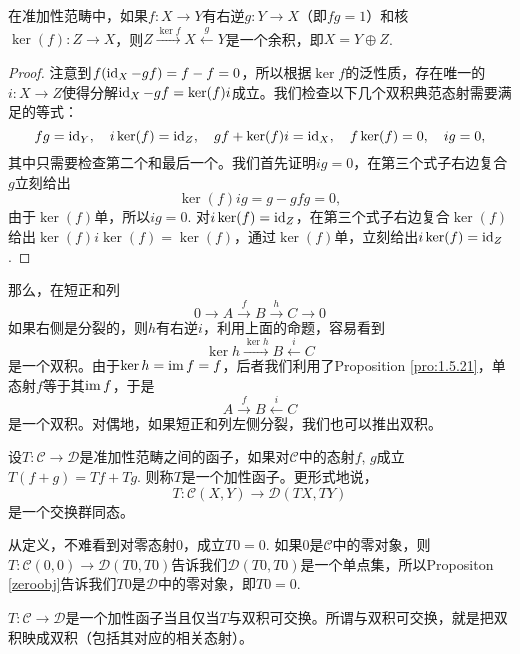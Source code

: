 \begin{pro}
在准加性范畴中，如果$f:X\to Y$有右逆$g:Y\to X$（即$fg=1$）和核$\ker(f):Z\to X$，则$Z\xrightarrow{\ker f}X\xleftarrow{g}Y$是一个余积，即$X=Y\oplus Z$.
\end{pro}

\begin{proof}
注意到$f(\operatorname{id}_X-gf)=f-f=0$，所以根据$\ker f$的泛性质，存在唯一的$i:X\to Z$使得分解$\operatorname{id}_X-gf=\ker (f)i$成立。我们检查以下几个双积典范态射需要满足的等式：
\[
	fg=\operatorname{id}_Y,\quad i\ker(f)=\operatorname{id}_{Z},\quad gf+\ker (f)i=\operatorname{id}_X,\quad f\ker(f)=0,\quad 
	ig=0,
\]
其中只需要检查第二个和最后一个。我们首先证明$ig=0$，在第三个式子右边复合$g$立刻给出
\[
	\ker(f)ig=g-gfg=0,
\]
由于$\ker(f)$单，所以$ig=0$. 对$i\ker(f)=\operatorname{id}_{Z}$，在第三个式子右边复合$\ker(f)$给出$\ker(f)i\ker(f)=\ker(f)$，通过$\ker(f)$单，立刻给出$i\ker(f)=\operatorname{id}_{Z}$.
\end{proof}

那么，在短正和列
\[
	0\to A\xrightarrow{f}B\xrightarrow{h}C\to 0
\]
如果右侧是分裂的，则$h$有右逆$i$，利用上面的命题，容易看到
\[
	\ker h\xrightarrow{\ker h}B\xleftarrow{i}C
\]
是一个双积。由于$\ker h = \operatorname{im} f=f$，后者我们利用了Proposition \ref{pro:1.5.21}，单态射$f$等于其$\operatorname{im} f$，于是
\[
	A\xrightarrow{f}B\xleftarrow{i}C
\]
是一个双积。对偶地，如果短正和列左侧分裂，我们也可以推出双积。


\begin{para}
设$T:\mathcal{C}\to \mathcal{D}$是准加性范畴之间的函子，如果对$\mathcal{C}$中的态射$f$, $g$成立$T(f+g)=Tf+Tg$. 则称$T$是一个加性函子。更形式地说，
\[
	T:\mathcal{C}(X,Y)\to \mathcal{D}(TX,TY)
\]
是一个交换群同态。
\end{para}

从定义，不难看到对零态射$0$，成立$T0=0$. 如果$0$是$\mathcal{C}$中的零对象，则$T:\mathcal{C}(0,0)\to \mathcal{D}(T0,T0)$告诉我们$\mathcal{D}(T0,T0)$是一个单点集，所以Propositon \ref{zeroobj}告诉我们$T0$是$\mathcal{D}$中的零对象，即$T0=0$.

\begin{pro}
$T:\mathcal{C}\to \mathcal{D}$是一个加性函子当且仅当$T$与双积可交换。所谓与双积可交换，就是把双积映成双积（包括其对应的相关态射）。
\end{pro}

